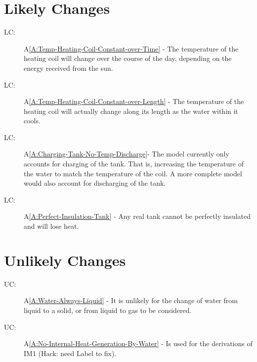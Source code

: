 \documentclass[12pt]{article}
\newcounter{lcnum}
\newcommand{\lcthelcnum}{LC\thelcnum}
\newcounter{ucnum}
\newcommand{\uctheucnum}{UC\theucnum}
\begin{document}
\section{Likely Changes}
\label{Sec:LCs}
\begin{description}
\item[\lcthelcnum\label{LC:Temperature-Coil-Variable-Over-Day}:]A\ref{A:Temp-Heating-Coil-Constant-over-Time} - The temperature of the heating coil will change over the course of the day, depending on the energy received from the sun.
\end{description}
\begin{description}
\item[\lcthelcnum\label{LC:Temperature-Coil-Variable-Over-Length}:]A\ref{A:Temp-Heating-Coil-Constant-over-Length} - The temperature of the heating coil will actually change along its length as the water within it cools.
\end{description}
\begin{description}
\item[\lcthelcnum\label{LC:Discharging-Tank}:]A\ref{A:Charging-Tank-No-Temp-Discharge}- The model currently only accounts for charging of the tank. That is, increasing the temperature of the water to match the temperature of the coil. A more complete model would also account for discharging of the tank.
\end{description}
\begin{description}
\item[\lcthelcnum\label{LC:Tank-Lose-Heat}:]A\ref{A:Perfect-Insulation-Tank} - Any real tank cannot be perfectly insulated and will lose heat.
\end{description}
\section{Unlikely Changes}
\label{Sec:UCs}
\begin{description}
\item[\uctheucnum\label{UC:Water-Fixed-States}:]A\ref{A:Water-Always-Liquid} - It is unlikely for the change of water from liquid to a solid, or from liquid to gas to be considered.
\end{description}
\begin{description}
\item[\uctheucnum\label{UC:No-Internal-Heat-Generation}:]A\ref{A:No-Internal-Heat-Generation-By-Water} - Is used for the derivations of IM1 (Hack: need Label to fix).
\end{description}
\end{document}
